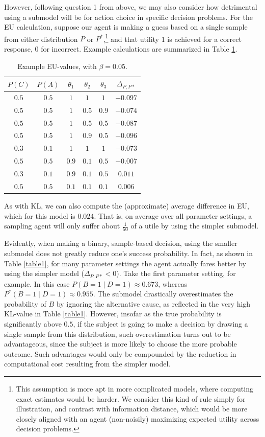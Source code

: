 \documentclass[10pt,letterpaper]{article}
\begin{document}
However, following question 1 from above, we may also consider how detrimental using a submodel will be for action choice in specific decision problems.
For the EU calculation, suppose our agent is making a guess based on a single sample from either distribution $P$ or $P^*$,\footnote{This assumption is more apt in more complicated models, where computing exact estimates would be harder. We consider this kind of rule simply for illustration, and contrast with information distance, which would be more closely aligned with an agent (non-noisily) maximizing expected utility across decision problems.\label{fn}} and that utility 1 is achieved for a correct response, 0 for incorrect. Example calculations are summarized in Table \ref{table2}.
%
\begin{table}[h]  \begin{center}
\begin{tabular}{c | c | c | c | c || c}
 $P(C)$ & $P(A)$ & $\theta_1$ & $\theta_2$ & $\theta_3$ & $\Delta_{P,P*}$ \\ \hline
 $0.5$ & $0.5$ & $1$ & $1$ & $1$  & $-0.097$ \\
  $0.5$ & $0.5$ & $1$ & $0.5$ & $0.9$  & $-0.074$ \\
  $0.5$ & $0.5$ &$1$ & $0.5$ & $0.5$  & $-0.087$ \\
 $0.5$ & $0.5$ & $1$ & $0.9$ & $0.5$  & $-0.096$ \\
  $0.3$ & $0.1$ & $1$ & $1$ & $1$ & $-0.073$ \\
 $0.5$ & $0.5$ &  $0.9$ & $0.1$ & $0.5$  & $-0.007$ \\
  $0.3$ & $0.1$ & $0.9$ & $0.1$ & $0.5$ & $0.011$ \\
 $0.5$ & $0.5$ & $0.1$ & $0.1$ & $0.1$ & $0.006$ 
\end{tabular} \end{center} \caption{Example EU-values, with $\beta = 0.05$.} \label{table2}
\end{table}
%
As with KL, we can also compute the (approximate) average difference in EU, which for this model is $0.024$. That is, on average over all parameter settings, a sampling agent will only suffer about $\frac{1}{50}$ of a utile by using the simpler submodel.

Evidently, when making a binary, sample-based decision, using the smaller submodel does not greatly reduce one's success probability. In fact, as shown in Table \ref{table1}, for many parameter settings the agent actually fares better by using the simpler model ($\Delta_{P,P*}<0$). Take the first parameter setting, for example. In this case $P(B=1\mid D=1) \approx 0.673$, whereas $P^*(B=1 \mid D=1) \approx 0.955$. The submodel drastically overestimates the probability of $B$ by ignoring the alternative cause, as reflected in the very high KL-value in Table \ref{table1}. However, insofar as the true probability is significantly above $0.5$, if the subject is going to make a decision by drawing a single sample from this distribution, such overestimation turns out to be advantageous, since the subject is more likely to choose the more probable outcome. Such advantages would only be compounded by the reduction in computational cost resulting from the simpler model.
\end{document}
